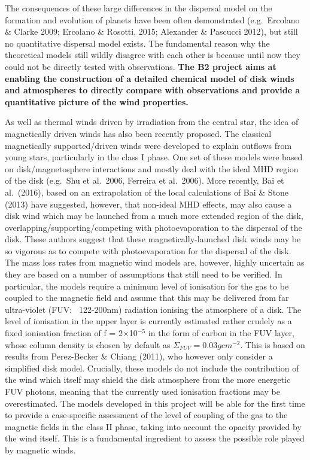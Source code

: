 \documentclass[10pt,fleqn,twoside]{article}
\begin{document}
The consequences of these large differences in the dispersal model on
the formation and evolution of planets have been often demonstrated
(e.g.\ Ercolano \&  Clarke 2009; Ercolano \& Rosotti, 2015; Alexander
\& Pascucci 2012), but still no quantitative dispersal model exists.
The fundamental reason why the theoretical models still wildly
disagree with each other is because until now they could not be
directly tested with observations. {\bf The B2  project aims at enabling
the construction of a detailed chemical model of disk winds and
atmospheres to directly compare with observations and provide a
quantitative picture of the wind properties. }

As well as thermal winds driven by irradiation from the central star,
the idea of magnetically driven winds has also been recently
proposed.  The classical magnetically supported/driven winds were developed to explain outflows from young stars, particularly in the class I phase. One set of these models were based on disk/magnetosphere interactions and mostly deal with the ideal MHD region of the disk (e.g.\ Shu et al.\ 2006, Ferreira et al.\ 2006). 
More recently, Bai et al.\ (2016), based on an extrapolation of the
local calculations of Bai \& Stone (2013) have suggested, however, that
non-ideal MHD effects, may also cause a disk wind which may be
launched from a much more extended region of the disk,
overlapping/supporting/competing with photoevaporation to the
dispersal of the disk. These authors suggest that these magnetically-launched disk
winds may be so vigorous as to compete with
photoevaporation for the dispersal of the disk.
The mass loss rates from magnetic wind models are, however, highly uncertain as they are
based on a number of assumptions that still need to be verified. In
particular, the models require a minimum level of ionisation for the
gas to be coupled to the magnetic field and assume that this may be
delivered from far ultra-violet (FUV: ~122-200nm) radiation ionising
the atmosphere of a disk. The level of ionisation in the upper layer
is currently estimated rather crudely as a fixed ionisation fraction
of f = 2$\times$10$^{-5}$ in the form of carbon in the FUV layer, whose column
density is chosen by default as $\Sigma_{FUV} = 0.03 g cm^{-2}$. This is based on
results from Perez-Becker \& Chiang (2011), who however only consider
a simplified disk model. Crucially, these models do not include the
contribution of the wind which itself may shield the disk atmosphere
from the more energetic FUV photons, meaning that the currently used
ionisation fractions may be overestimated. 
The models developed in this project will be able for the first time
to provide a case-specific assessment of the level of coupling of the
gas to the magnetic fields in the class II phase, taking into account
the opacity provided by the wind itself. This is a fundamental
ingredient to assess the possible role played by magnetic winds.  
\end{document}
